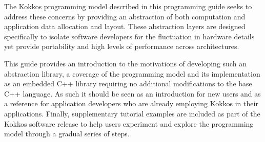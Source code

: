The Kokkos programming model described in this programming guide seeks to address these
concerns by providing an abstraction of both computation and application data allocation and
layout. These abstraction layers are designed specifically to isolate software developers for
the fluctuation in hardware details yet provide portability and high levels of performance
across architectures.

This guide provides an introduction to the motivations of developing such an abstraction library,
a coverage of the programming model and its implementation as an embedded C++ library requiring
no additional modifications to the base C++ language. As such it should be seen as an introduction
for new users and as a reference for application developers who are already employing Kokkos
in their applications. Finally, supplementary tutorial examples are included as part of the
Kokkos software release to help users experiment and explore the programming model through a 
gradual series of steps.

